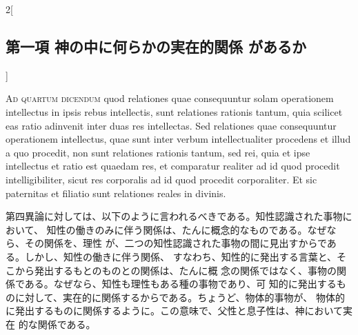 \documentclass[paper=a4paper,fontsize=10pt,jafontsize=9pt,titlepage]{jlreq}
\begin{document}
\begin{paracol}{2}[\subsection{第一項 神の中に何らかの実在的関係 があるか}]
\switchcolumn*[\subsection{ad.4}]


{\scshape Ad quartum dicendum} quod relationes quae consequuntur solam operationem
intellectus in ipsis rebus intellectis, sunt relationes rationis tantum,
quia scilicet eas ratio adinvenit inter duas res intellectas. Sed
relationes quae consequuntur operationem intellectus, quae sunt inter
verbum intellectualiter procedens et illud a quo procedit, non sunt
relationes rationis tantum, sed rei, quia et ipse intellectus et ratio
est quaedam res, et comparatur realiter ad id quod procedit
intelligibiliter, sicut res corporalis ad id quod procedit
corporaliter. Et sic paternitas et filiatio sunt relationes reales in
divinis.


\switchcolumn


第四異論に対しては、以下のように言われるべきである。知性認識された事物において、
知性の働きのみに伴う関係は、たんに概念的なものである。なぜなら、その関係を、理性
が、二つの知性認識された事物の間に見出すからである。しかし、知性の働きに伴う関係、
すなわち、知性的に発出する言葉と、そこから発出するもとのものとの関係は、たんに概
念の関係ではなく、事物の関係である。なぜなら、知性も理性もある種の事物であり、可
知的に発出するものに対して、実在的に関係するからである。ちょうど、物体的事物が、
物体的に発出するものに関係するように。この意味で、父性と息子性は、神において実在
的な関係である。


\switchcolumn*



\end{paracol}
\newpage





\end{document}

